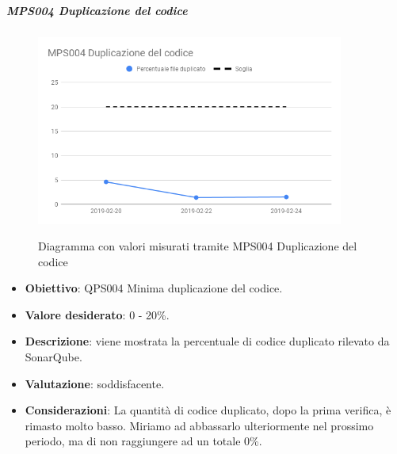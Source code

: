     \subparagraph{MPS004 Duplicazione del codice}
    
    \begin{figure}[H]
        \centering
        \includegraphics[width=0.9\textwidth]{img/cruscotti/MPS004.png}
        \label{immaginePresenzaDupplicazioneCodice}
        \caption{Diagramma con valori misurati tramite MPS004 Duplicazione del codice}
    \end{figure}
    
    \begin{itemize}
        \item \textbf{Obiettivo}: QPS004 Minima duplicazione del codice.
        \item \textbf{Valore desiderato}: 0 - 20\%.
        \item \textbf{Descrizione}: viene mostrata la percentuale di codice duplicato rilevato da SonarQube.
        \item \textbf{Valutazione}: soddisfacente.
        \item \textbf{Considerazioni}: La quantità di codice duplicato, dopo la prima verifica, è rimasto molto basso. Miriamo ad abbassarlo ulteriormente nel prossimo periodo, ma di non raggiungere ad un totale 0\%.
    \end{itemize}